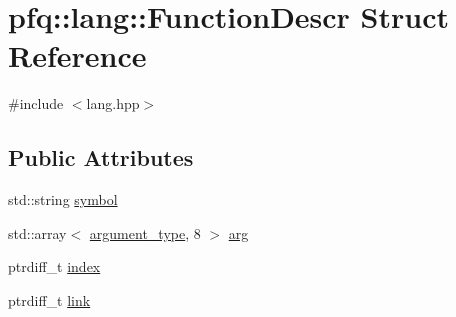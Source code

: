 \hypertarget{structpfq_1_1lang_1_1FunctionDescr}{\section{pfq\+:\+:lang\+:\+:Function\+Descr Struct Reference}
\label{structpfq_1_1lang_1_1FunctionDescr}
}


{\ttfamily \#include $<$lang.\+hpp$>$}

\subsection*{Public Attributes}
\begin{DoxyCompactItemize}
\item 
std\+::string \hyperlink{structpfq_1_1lang_1_1FunctionDescr_a21f51c65f55dddd54de1171d8914c030}{symbol}
\item 
std\+::array$<$ \hyperlink{structpfq_1_1lang_1_1argument__type}{argument\+\_\+type}, 8 $>$ \hyperlink{structpfq_1_1lang_1_1FunctionDescr_af1fe3a86f26dc3f74532ce718a195006}{arg}
\item 
ptrdiff\+\_\+t \hyperlink{structpfq_1_1lang_1_1FunctionDescr_a4d9c2d281e407d12964765e3e83d96a5}{index}
\item 
ptrdiff\+\_\+t \hyperlink{structpfq_1_1lang_1_1FunctionDescr_a2a4e8faafeb322d43070236093d2181b}{link}
\end{DoxyCompactItemize}


